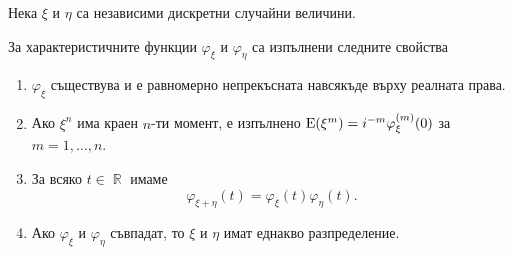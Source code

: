 \documentclass{../../common/topic}
\begin{document}
\begin{theorem}\label{thm:char_properties}
  Нека \( \xi \) и \( \eta \) са независими дискретни случайни величини.

  За характеристичните функции \( \varphi_\xi \) и \( \varphi_\eta \) са изпълнени следните свойства
  \begin{enumerate}
    \item \( \varphi_\xi \) съществува и е равномерно непрекъсната навсякъде върху реалната права.

    \item Ако \( \xi^n \) има краен \( n \)-ти момент, е изпълнено \( \operatorname{E}(\xi^m) = i^{-m} \varphi_\xi^{(m)} (0) \) за \( m = 1, \ldots, n \).

    \item За всяко \( t \in \BbbR \) имаме
    \begin{equation*}
      \varphi_{\xi + \eta}(t) = \varphi_\xi(t) \varphi_\eta(t).
    \end{equation*}

    \item Ако \( \varphi_\xi \) и \( \varphi_\eta \) съвпадат, то \( \xi \) и \( \eta \) имат еднакво разпределение.
  \end{enumerate}
\end{theorem}
\end{document}
